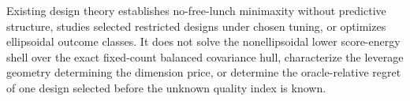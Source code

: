 Existing design theory establishes no-free-lunch minimaxity without predictive structure, studies selected restricted designs under chosen tuning, or optimizes ellipsoidal outcome classes. It does not solve the nonellipsoidal lower score-energy shell over the exact fixed-count balanced covariance hull, characterize the leverage geometry determining the dimension price, or determine the oracle-relative regret of one design selected before the unknown quality index is known.